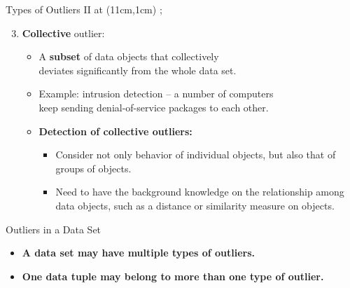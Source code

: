 \begin{frame}{Types of Outliers II}
	\tikzoverlay at (11cm,1cm) {};
	\begin{enumerate}
		\setcounter{enumi}{2}
		\item \textbf{Collective} outlier:
		      \begin{itemize}
			      \item A \textbf{subset} of data objects that collectively \\
			            deviates significantly from the whole data set.
			      \item Example: intrusion detection -- a number of computers \\
			            keep sending denial-of-service packages to each other.
			      \item \textbf{Detection of collective outliers:}
			            \begin{itemize}
				            \item Consider not only behavior of individual objects, but also that of groups of objects.
				            \item Need to have the background knowledge on the relationship among data objects, such as a distance or similarity measure on objects.
			            \end{itemize}
		      \end{itemize}
	\end{enumerate}

	\begin{alertblock}{Outliers in a Data Set}
		\begin{itemize}
			\item \textbf{A data set may have multiple types of outliers.}
			\item \textbf{One data tuple may belong to more than one type of outlier.}
		\end{itemize}

	\end{alertblock}
\end{frame}



